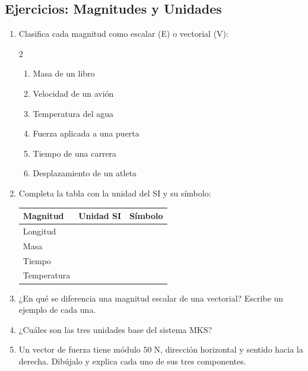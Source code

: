 \documentclass[12pt, a4paper]{article}
\begin{document}
\newpage

\subsection{Ejercicios: Magnitudes y Unidades}

\begin{enumerate}[leftmargin=*]
  \item \facil{} Clasifica cada magnitud como escalar (E) o vectorial (V):
  \begin{multicols}{2}
  \begin{enumerate}[label=\alph*)]
    \item Masa de un libro
    \item Velocidad de un avión
    \item Temperatura del agua
    \item Fuerza aplicada a una puerta
    \item Tiempo de una carrera
    \item Desplazamiento de un atleta
  \end{enumerate}
  \end{multicols}

  \item \facil{} Completa la tabla con la unidad del SI y su símbolo:
  \begin{center}
  \begin{tabular}{l|c|c}
  \textbf{Magnitud} & \textbf{Unidad SI} & \textbf{Símbolo} \\
  \hline
  Longitud & & \\
  Masa & & \\
  Tiempo & & \\
  Temperatura & & \\
  \end{tabular}
  \end{center}

  \item \facil{} ¿En qué se diferencia una magnitud escalar de una vectorial? Escribe un ejemplo de cada una.

  \item \facil{} ¿Cuáles son las tres unidades base del sistema MKS?

  \item \medio{} Un vector de fuerza tiene módulo $50\;\text{N}$, dirección horizontal y sentido hacia la derecha. Dibújalo y explica cada uno de sus tres componentes.


\end{enumerate}
\end{document}
